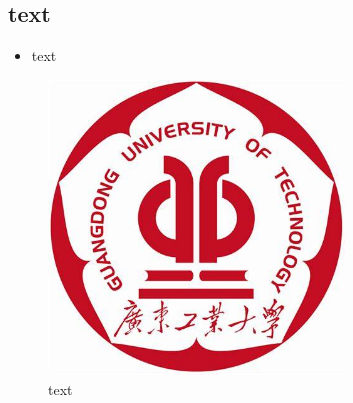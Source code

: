 \subsection{text}
\begin{itemize}
    \item text
\end{itemize}
\begin{figure}[h]
    \centering
    \includegraphics[width=0.7\textwidth]{figures/logo.png}
    \caption{text}
\end{figure}



